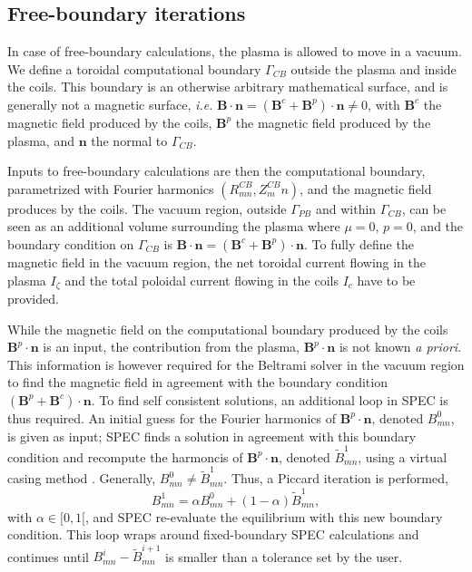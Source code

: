 \documentclass[my_thesis.tex]{subfiles}
\begin{document}
\subsection{Free-boundary iterations}
In case of free-boundary calculations, the plasma is allowed to move in a vacuum. We define a toroidal computational boundary $\Gamma_{CB}$ outside the plasma and inside the coils. This boundary is an otherwise arbitrary mathematical surface, and is generally not a magnetic surface, \textit{i.e.} $\mathbf{B}\cdot\mathbf{n} = (\mathbf{B}^c+\mathbf{B}^p)\cdot\mathbf{n}\neq 0$, with $\mathbf{B}^c$ the magnetic field produced by the coils, $\mathbf{B}^p$ the magnetic field produced by the plasma, and $\mathbf{n}$ the normal to $\Gamma_{CB}$.

Inputs to free-boundary calculations are then the computational boundary, parametrized with Fourier harmonics $(R^{CB}_{mn},Z^{CB}_mn)$, and the magnetic field produces by the coils. The vacuum region, outside $\Gamma_{PB}$ and within $\Gamma_{CB}$, can be seen as an additional volume surrounding the plasma where $\mu=0$, $p=0$, and the boundary condition on $\Gamma_{CB}$ is $\mathbf{B}\cdot\mathbf{n}=(\mathbf{B}^c+\mathbf{B}^p)\cdot\mathbf{n}$. To fully define the magnetic field in the vacuum region, the net toroidal current flowing in the plasma $I_\zeta$ and the total poloidal current flowing in the coils $I_c$ have to be provided.

While the magnetic field on the computational boundary produced by the coils $\mathbf{B}^p\cdot\mathbf{n}$ is an input, the contribution from the plasma, $\mathbf{B}^p\cdot\mathbf{n}$ is not known \textit{a priori}. This information is however required for the Beltrami solver in the vacuum region to find the magnetic field in agreement with the boundary condition $(\mathbf{B}^p+\mathbf{B}^c)\cdot\mathbf{n}$. To find self consistent solutions, an additional loop in SPEC is thus required. An initial guess for the Fourier harmonics of $\mathbf{B}^p\cdot \mathbf{n}$, denoted $B_{mn}^0$, is given as input; SPEC finds a solution in agreement with this boundary condition and recompute the harmoncis of $\mathbf{B}^p\cdot\mathbf{n}$, denoted $\tilde{B}_{mn}^1$, using a virtual casing method \citep{Lazerson2012,Hanson2015}. Generally, $B_{mn}^0\neq \tilde{B}_{mn}^1$. Thus, a Piccard iteration is performed,
\begin{equation}
	B_{mn}^1 = \alpha B_{mn}^0 + (1-\alpha) \tilde{B}_{mn}^1,
\end{equation}
with $\alpha\in[0,1[$, and SPEC re-evaluate the equilibrium with this new boundary condition. This loop wraps around fixed-boundary SPEC calculations and continues until $B_{mn}^i -\tilde{B}_{mn}^{i+1}$ is smaller than a tolerance set by the user.
\end{document}
